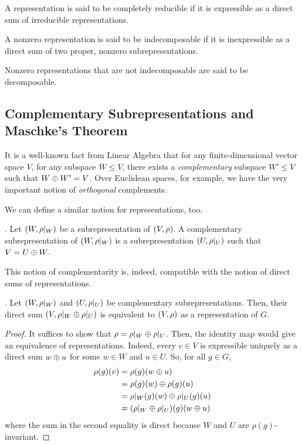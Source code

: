 \begin{boxdefinition}
    A representation is said to be completely reducible if it is expressible as a direct sum of irreducible representations.
\end{boxdefinition}

\begin{boxdefinition}[Indecomposability]
    A nonzero representation is said to be indecomposable if it is inexpressible as a direct sum of two proper, nonzero subrepresentations.
\end{boxdefinition}
Nonzero representations that are not indecomposable are said to be decomposable.

\subsection{Complementary Subrepresentations and Maschke's Theorem}

It is a well-known fact from Linear Algebra that for any finite-dimensional vector space $V$, for any subspace $W \leq V$, there exists a \textit{complementary} subspace $W' \leq V$ such that $W \oplus W' = V$. Over Euclidean spaces, for example, we have the very important notion of \textit{orthogonal} complements.

We can define a similar notion for representations, too.
\begin{boxdefinition}
    . Let $\left( W, \rho\vert_W \right)$ be a subrepresentation of $\left( V, \rho \right)$. A complementary subrepresentation of $\left( W, \rho\vert_W \right)$ is a subrepresentation $\left( U, \rho\vert_U \right)$ such that $V = U \oplus W$.
\end{boxdefinition}
This notion of complementarity is, indeed, compatible with the notion of direct sums of representations.
\begin{lemma}
    . Let $\left( W, \rho\vert_W \right)$ and $\left( U, \rho\vert_U \right)$ be complementary subrepresentations. Then, their direct sum $\left( V, \rho\vert_W \oplus \rho\vert_U \right)$ is equivalent to $\left( V, \rho \right)$ as a representation of $G$.
\end{lemma}
\begin{proof}
    It suffices to show that $\rho = \rho\vert_W \oplus \rho\vert_U$. Then, the identity map would give an equivalence of representations. Indeed, every $v \in V$ is expressible uniquely as a direct sum $w \oplus u$ for some $w \in W$ and $u \in U$. So, for all $g \in G$,
    \begin{align*}
        \rho(g)(v) &= \rho(g)(w \oplus u) \\
        &= \rho(g)(w) \oplus \rho(g)(u) \\
        &= \rho\vert_W(g)(w) \oplus \rho\vert_U(g)(u) \\
        &= \left( \rho\vert_W \oplus \rho\vert_U \right)\!(g)(w \oplus u)
    \end{align*}
    where the sum in the second equality is direct because $W$ and $U$ are $\rho(g)$-invariant.
\end{proof}

